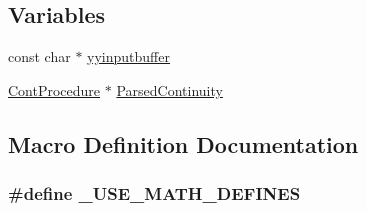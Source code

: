 \subsection*{Variables}
\begin{DoxyCompactItemize}
\item 
const char $\ast$ \hyperlink{a00194_af16723acd9cc8353403d36b04624da82}{yyinputbuffer}
\item 
\hyperlink{a00067}{Cont\-Procedure} $\ast$ \hyperlink{a00194_a26d6f5bc37e42edc9380bb729613bde4}{Parsed\-Continuity}
\end{DoxyCompactItemize}


\subsection{Macro Definition Documentation}
\hypertarget{a00194_a525335710b53cb064ca56b936120431e}{
\subsubsection[{\-\_\-\-U\-S\-E\-\_\-\-M\-A\-T\-H\-\_\-\-D\-E\-F\-I\-N\-E\-S}]{\setlength{\rightskip}{0pt plus 5cm}\#define \-\_\-\-U\-S\-E\-\_\-\-M\-A\-T\-H\-\_\-\-D\-E\-F\-I\-N\-E\-S}}\label{a00194_a525335710b53cb064ca56b936120431e}


